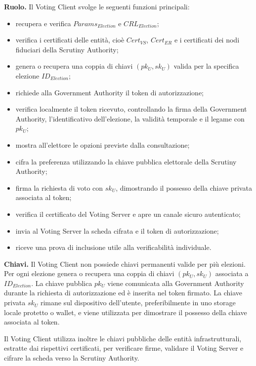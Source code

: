 \documentclass[a4paper,12pt]{article}
\begin{document}
\textbf{Ruolo.}
Il Voting Client svolge le seguenti funzioni principali:

\begin{itemize}
	\item recupera e verifica \(Params_{Election}\) e \(CRL_{Election}\);
	\item verifica i certificati delle entit\`a, cio\`e \(Cert_{VS}\), \(Cert_{ER}\) e i certificati dei nodi fiduciari della Scrutiny Authority;
	\item genera o recupera una coppia di chiavi \((pk_U, sk_U)\) valida per la specifica elezione \(ID_{Election}\);
	\item richiede alla Government Authority il token di autorizzazione;
	\item verifica localmente il token ricevuto, controllando la firma della Government Authority, l'identificativo dell'elezione, la validit\`a temporale e il legame con \(pk_U\);
	\item mostra all'elettore le opzioni previste dalla consultazione;
	\item cifra la preferenza utilizzando la chiave pubblica elettorale della Scrutiny Authority;
	\item firma la richiesta di voto con \(sk_U\), dimostrando il possesso della chiave privata associata al token;
	\item verifica il certificato del Voting Server e apre un canale sicuro autenticato;
	\item invia al Voting Server la scheda cifrata e il token di autorizzazione;
	\item riceve una prova di inclusione utile alla verificabilit\`a individuale.
\end{itemize}

\textbf{Chiavi.}
Il Voting Client non possiede chiavi permanenti valide per pi\`u elezioni.
Per ogni elezione genera o recupera una coppia di chiavi \((pk_U, sk_U)\) associata a \(ID_{Election}\).
La chiave pubblica \(pk_U\) viene comunicata alla Government Authority durante la richiesta di autorizzazione ed \`e inserita nel token firmato.
La chiave privata \(sk_U\) rimane sul dispositivo dell'utente, preferibilmente in uno storage locale protetto o wallet, e viene utilizzata per dimostrare il possesso della chiave associata al token.

Il Voting Client utilizza inoltre le chiavi pubbliche delle entit\`a infrastrutturali, estratte dai rispettivi certificati, per verificare firme, validare il Voting Server e cifrare la scheda verso la Scrutiny Authority.
\end{document}
